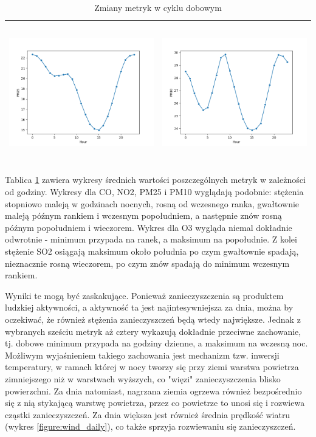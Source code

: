 \documentclass[18pt, letterpaper]{article}
\begin{document}
\begin{table}[H]
\begin{tabular}{|c|c|}
\includegraphics[width=80mm,height=60mm]{visualisations/cycles/hourly_PM25.png}  & \includegraphics[width=80mm,height=60mm]{visualisations/cycles/hourly_PM10.png} \\ \hline
\end{tabular}
\caption{Zmiany metryk w cyklu dobowym}
\label{table:daily}
\end{table}

Tablica \ref{table:daily} zawiera wykresy średnich wartości poszczególnych metryk w zależności od godziny. Wykresy dla CO, NO2, PM25 i PM10 wyglądają podobnie: stężenia stopniowo maleją w godzinach nocnych, rosną od wczesnego ranka, gwałtownie maleją późnym rankiem i wczesnym popołudniem, a następnie znów rosną późnym popołudniem i wieczorem. Wykres dla O3 wygląda niemal dokładnie odwrotnie - minimum przypada na ranek, a maksimum na popołudnie. Z kolei stężenie SO2 osiągają maksimum około południa po czym gwałtownie spadają, nieznacznie rosną wieczorem, po czym znów spadają do minimum wczesnym rankiem.

Wyniki te mogą być zaskakujące. Ponieważ zanieczyszczenia są produktem ludzkiej aktywności, a aktywność ta jest najintesywniejsza za dnia, można by oczekiwać, że również stężenia zanieczyszczeń będą wtedy największe. Jednak z wybranych sześciu metryk aż cztery wykazują dokładnie przeciwne zachowanie, tj. dobowe minimum przypada na godziny dzienne, a maksimum na wczesną noc. Możliwym wyjaśnieniem takiego zachowania jest mechanizm tzw. inwersji temperatury, w ramach której w nocy tworzy się przy ziemi warstwa powietrza zimniejszego niż w warstwach wyższych, co "więzi" zanieczyszczenia blisko powierzchni. Za dnia natomiast, nagrzana ziemia ogrzewa również bezpośrednio się z nią stykającą warstwę powietrza, przez co powietrze to unosi się i rozwiewa cząstki zanieczyszczeń. Za dnia większa jest również średnia prędkość wiatru (wykres \ref{figure:wind_daily}), co także sprzyja rozwiewaniu się zanieczyszczeń.
\end{document}
